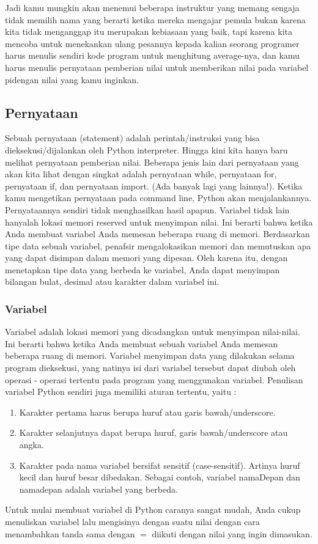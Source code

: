Jadi kamu mungkin akan menemui beberapa instruktur yang memang sengaja tidak memilih nama yang berarti ketika mereka mengajar pemula bukan karena kita tidak menganggap itu merupakan kebiasaan yang baik, tapi karena kita mencoba untuk menekankan ulang pesannya kepada kalian seorang programer  harus menulis sendiri kode program untuk menghitung average-nya, dan kamu harus menulis pernyataan pemberian nilai untuk memberikan nilai pada variabel pidengan nilai yang kamu inginkan. 

\subsection{Pernyataan}
	Sebuah pernyataan (statement) adalah perintah/instruksi yang bisa dieksekusi/dijalankan oleh Python interpreter. Hingga kini kita hanya baru melihat pernyataan pemberian nilai. Beberapa jenis lain dari pernyataan yang akan kita lihat dengan singkat adalah pernyataan  while, pernyataan for, pernyataan if, dan pernyataan import. (Ada banyak lagi yang lainnya!).
Ketika kamu mengetikan pernyataan pada command line, Python akan menjalankannya. Pernyataannya sendiri tidak menghasilkan hasil apapun. 
Variabel tidak lain hanyalah lokasi memori reserved untuk menyimpan nilai. Ini berarti bahwa ketika Anda membuat variabel Anda memesan beberapa ruang di memori.
Berdasarkan tipe data sebuah variabel, penafsir mengalokasikan memori dan memutuskan apa yang dapat disimpan dalam memori yang dipesan. Oleh karena itu, dengan menetapkan tipe data yang berbeda ke variabel, Anda dapat menyimpan bilangan bulat, desimal atau karakter dalam variabel ini.

\subsubsection{Variabel}
	Variabel adalah lokasi memori yang dicadangkan untuk menyimpan nilai-nilai. Ini berarti bahwa ketika Anda membuat sebuah variabel Anda memesan beberapa ruang di memori. Variabel menyimpan data yang dilakukan selama program dieksekusi, yang natinya isi dari variabel tersebut dapat diubah oleh operasi - operasi tertentu pada program yang menggunakan variabel.
Penulisan variabel Python sendiri juga memiliki aturan tertentu, yaitu : 
\begin{enumerate}
	\item Karakter pertama harus berupa huruf atau garis bawah/underscore.
 	\item Karakter selanjutnya dapat berupa huruf, garis bawah/underscore atau angka.
	\item Karakter pada nama variabel bersifat sensitif (case-sensitif). Artinya huruf kecil dan huruf besar dibedakan. 
	Sebagai contoh, variabel namaDepan dan namadepan adalah variabel yang berbeda.
\end{enumerate}
Untuk mulai membuat variabel di Python caranya sangat mudah, Anda cukup menuliskan variabel lalu mengisinya dengan suatu nilai dengan cara menambahkan tanda sama dengan \(=\) diikuti dengan nilai yang ingin dimasukan. 

